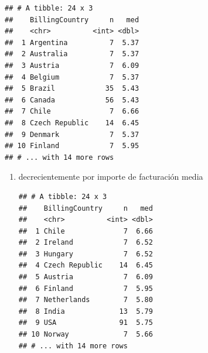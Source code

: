 \documentclass[]{book}
\newenvironment{Shaded}{\begin{snugshade}}{\end{snugshade}}
\newcommand{\KeywordTok}[1]{\textcolor[rgb]{0.13,0.29,0.53}{\textbf{#1}}}
\newcommand{\DataTypeTok}[1]{\textcolor[rgb]{0.13,0.29,0.53}{#1}}
\newcommand{\StringTok}[1]{\textcolor[rgb]{0.31,0.60,0.02}{#1}}
\newcommand{\OtherTok}[1]{\textcolor[rgb]{0.56,0.35,0.01}{#1}}
\newcommand{\OperatorTok}[1]{\textcolor[rgb]{0.81,0.36,0.00}{\textbf{#1}}}
\newcommand{\NormalTok}[1]{#1}
\begin{document}
\begin{enumerate}
\begin{Shaded}
\end{Shaded}

\begin{verbatim}
## # A tibble: 24 x 3
##    BillingCountry     n   med
##    <chr>          <int> <dbl>
##  1 Argentina          7  5.37
##  2 Australia          7  5.37
##  3 Austria            7  6.09
##  4 Belgium            7  5.37
##  5 Brazil            35  5.43
##  6 Canada            56  5.43
##  7 Chile              7  6.66
##  8 Czech Republic    14  6.45
##  9 Denmark            7  5.37
## 10 Finland            7  5.95
## # ... with 14 more rows
\end{verbatim}
\end{enumerate}

\begin{enumerate}
\def\labelenumi{(\alph{enumi})}
\setcounter{enumi}{1}
\item
  decrecientemente por importe de facturación media

\begin{Shaded}
\end{Shaded}

\begin{verbatim}
## # A tibble: 24 x 3
##    BillingCountry     n   med
##    <chr>          <int> <dbl>
##  1 Chile              7  6.66
##  2 Ireland            7  6.52
##  3 Hungary            7  6.52
##  4 Czech Republic    14  6.45
##  5 Austria            7  6.09
##  6 Finland            7  5.95
##  7 Netherlands        7  5.80
##  8 India             13  5.79
##  9 USA               91  5.75
## 10 Norway             7  5.66
## # ... with 14 more rows
\end{verbatim}
\end{enumerate}
\end{document}
